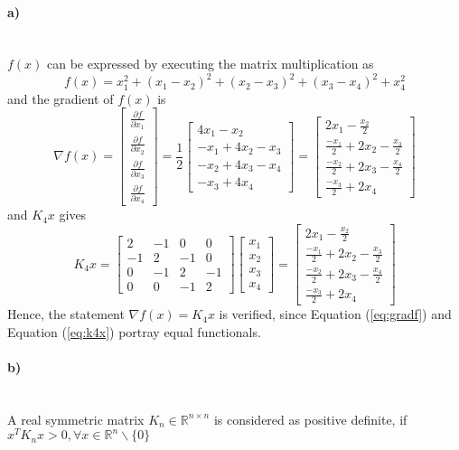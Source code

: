 \documentclass[a4paper]{article}
\newcommand{\R}{\mathbb{R}}
\newcommand*{\BMAT}[1]
{
	\begin{bmatrix}
		#1 
	\end{bmatrix}
}
\newcommand*{\EQ}[1]{Equation (\ref{eq:#1})}
\begin{document}
\paragraph{a)}\mbox{} \\
$f(x)$ can be expressed by executing the matrix multiplication as
\begin{equation}
	f(x)= x_1^2 + (x_1 - x_2)^2 + (x_2 - x_3)^2 + (x_3 - x_4)^2 + x_4^2
\end{equation}
and the gradient of $f(x)$ is
\begin{equation}
	\nabla f(x) = \BMAT{\frac{\partial f}{\partial x_1} \\
					   \frac{\partial f}{\partial x_2} \\
					   \frac{\partial f}{\partial x_3} \\
					   \frac{\partial f}{\partial x_4} }					   
				=\frac{1}{2} \BMAT{4x_1 - x_2\\
								   -x_1 + 4x_2 -x_3\\
								   -x_2 +4x_3 - x_4\\
								   -x_3 + 4x_4}
				= \BMAT{2 x_1 - \frac{x_2}{2} 				  \\
					    \frac{-x_1}{2}  + 2x_2 - \frac{x_3}{2}\\
					    \frac{-x_2}{2}  + 2x_3 - \frac{x_4}{2}\\
					    \frac{-x_3}{2}  + 2x_4}
					    \label{eq:gradf}
\end{equation}
and $K_4 x$ gives
\begin{equation}
	K_4 x = \BMAT{2 & -1 & 0 & 0\\
			     -1 & 2 & -1 & 0\\
				  0 & -1 & 2 & -1\\
				  0 & 0 & -1 & 2}
			\BMAT{x_1\\
			      x_2\\
				  x_3\\
				  x_4}
			= 
			\BMAT{2 x_1 - \frac{x_2}{2} 				  \\
	    	    \frac{-x_1}{2}  + 2x_2 - \frac{x_3}{2}\\
			    \frac{-x_2}{2}  + 2x_3 - \frac{x_4}{2}\\
			    \frac{-x_3}{2}  + 2x_4}
			    \label{eq:k4x}
\end{equation}
Hence, the statement $\nabla f(x) = K_4 x$ is verified, since \EQ{gradf} and \EQ{k4x} portray equal functionals. 
\paragraph{b)}\mbox{} \\
A real symmetric matrix $K_n \in \R^{n \times n}$ is considered as positive definite, if $x^T K_n x > 0, \forall x \in \R^n \backslash \{0\}$
\end{document}
